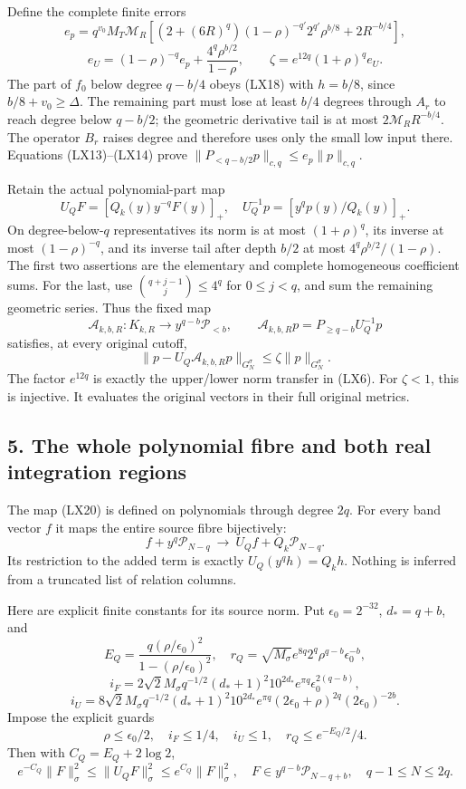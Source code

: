 \documentclass[10pt]{article}
\begin{document}
Define the complete finite errors \[
e_p=q^{v_0}M_T\mathcal M_R
\left[(2+(6R)^q)(1-\rho)^{-q'}2^{q'}\rho^{b/8}
+2R^{-b/4}\right],
\] \[
e_U=(1-\rho)^{-q}e_p+\frac{4^q\rho^{b/2}}{1-\rho},
\qquad \zeta=e^{12q}(1+\rho)^q e_U.
\tag{LX19}
\] The part of \(f_0\) below degree \(q-b/4\) obeys (LX18) with \(h=b/8\), since \(b/8+v_0\ge\Delta\). The remaining part must lose at least \(b/4\) degrees through \(A_r\) to reach degree below \(q-b/2\); the geometric derivative tail is at most \(2\mathcal M_RR^{-b/4}\). The operator \(B_r\) raises degree and therefore uses only the small low input there. Equations (LX13)--(LX14) prove \(\|P_{<q-b/2}p\|_{c,q}\le e_p\|p\|_{c,q}\).

Retain the actual polynomial-part map \[
U_QF=[Q_k(y)y^{-q}F(y)]_+,
\quad U_Q^{-1}p=[y^qp(y)/Q_k(y)]_+.
\tag{LX20}
\] On degree-below-\(q\) representatives its norm is at most \((1+\rho)^q\), its inverse at most \((1-\rho)^{-q}\), and its inverse tail after depth \(b/2\) at most \(4^q\rho^{b/2}/(1-\rho)\). The first two assertions are the elementary and complete homogeneous coefficient sums. For the last, use \(\binom{q+j-1}j\le4^q\) for \(0\le j<q\), and sum the remaining geometric series. Thus the fixed map \[
\mathcal A_{k,b,R}:K_{k,R}\longrightarrow y^{q-b}\mathcal P_{<b},
\qquad \mathcal A_{k,b,R}p=P_{\ge q-b}U_Q^{-1}p
\] satisfies, at every original cutoff, \[
\|p-U_Q\mathcal A_{k,b,R}p\|_{G_N^\sigma}
\le\zeta\|p\|_{G_N^\sigma}.
\tag{LX21}
\] The factor \(e^{12q}\) is exactly the upper/lower norm transfer in (LX6). For \(\zeta<1\), this is injective. It evaluates the original vectors in their full original metrics.

\subsection{5. The whole polynomial fibre and both real integration regions}\label{the-whole-polynomial-fibre-and-both-real-integration-regions}

The map (LX20) is defined on polynomials through degree \(2q\). For every band vector \(f\) it maps the entire source fibre bijectively: \[
f+y^q\mathcal P_{N-q}\ \longrightarrow\ U_Qf+Q_k\mathcal P_{N-q}.
\tag{LX22}
\] Its restriction to the added term is exactly \(U_Q(y^qh)=Q_kh\). Nothing is inferred from a truncated list of relation columns.

Here are explicit finite constants for its source norm. Put \(\epsilon_0=2^{-32}\), \(d_*=q+b\), and \[
E_Q=\frac{q(\rho/\epsilon_0)^2}{1-(\rho/\epsilon_0)^2},\quad
r_Q=\sqrt{M_\sigma}e^{8q}2^q\rho^{q-b}\epsilon_0^{-b},
\] \[
i_F=2\sqrt2M_\sigma q^{-1/2}(d_*+1)^2 10^{2d_*}e^{\pi q}
\epsilon_0^{2(q-b)},
\] \[
i_U=8\sqrt2M_\sigma q^{-1/2}(d_*+1)^2 10^{2d_*}e^{\pi q}
(2\epsilon_0+\rho)^{2q}(2\epsilon_0)^{-2b}.
\tag{LX23}
\] Impose the explicit guards \[
\rho\le\epsilon_0/2,\quad i_F\le1/4,\quad i_U\le1,
\quad r_Q\le e^{-E_Q/2}/4.
\tag{LX24}
\] Then with \(C_Q=E_Q+2\log2\), \[
e^{-C_Q}\|F\|_\sigma^2\le\|U_QF\|_\sigma^2
\le e^{C_Q}\|F\|_\sigma^2,
\quad F\in y^{q-b}\mathcal P_{N-q+b},\quad q-1\le N\le2q.
\tag{LX25}
\]
\end{document}
